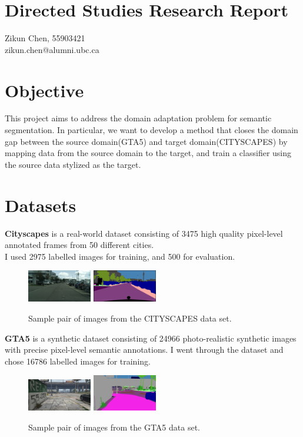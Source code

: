 \documentclass{article}
\begin{document}
\section*{Directed Studies Research Report}
Zikun Chen, 55903421\\
zikun.chen@alumni.ubc.ca
\section{Objective}
This project aims to address the domain adaptation problem for semantic segmentation. In particular, we want to develop a method that closes the domain gap between the source domain(GTA5) and target domain(CITYSCAPES) by mapping data from the source domain to the target, and train a classifier using the source data stylized as the target.
\section{Datasets}
\textbf{Cityscapes} \cite{cordts2016cityscapes} is a real-world dataset consisting of 3475 high quality pixel-level annotated frames from 50 different cities.\\ I used 2975 labelled images for training, and 500 for evaluation.\\
\begin{figure}[H]
    \centering
    \includegraphics[width=0.25\textwidth]{figures/ulm_000088_000019_leftImg8bit.jpg}
    \includegraphics[width=0.25\textwidth]{figures/ulm_000088_000019_gtFine_color.png}
    \caption{Sample pair of images from the CITYSCAPES data set.}
    \label{fig:cityscapes}
\end{figure}
\textbf{GTA5} \cite{richter2016playing} is a synthetic dataset consisting of 24966 photo-realistic synthetic images with precise pixel-level semantic annotations. I went through the dataset and chose 16786 labelled images for training.
\begin{figure}[H]
    \centering
    \includegraphics[width=0.25\textwidth]{figures/068_02196.jpg}
    \includegraphics[width=0.25\textwidth]{figures/068_02196.png}
    \caption{Sample pair of images from the GTA5 data set.}
    \label{fig:GTA5}
\end{figure}
\end{document}
